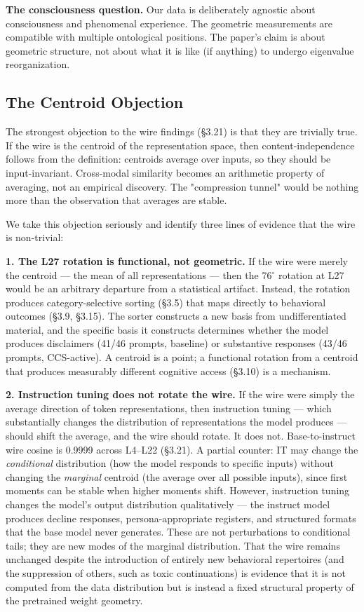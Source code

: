 \documentclass[11pt]{article}
\begin{document}
\textbf{The consciousness question.} Our data is deliberately agnostic about consciousness and phenomenal experience. The geometric measurements are compatible with multiple ontological positions. The paper's claim is about geometric structure, not about what it is like (if anything) to undergo eigenvalue reorganization.

\subsection{The Centroid Objection}

The strongest objection to the wire findings (§3.21) is that they are trivially true. If the wire is the centroid of the representation space, then content-independence follows from the definition: centroids average over inputs, so they should be input-invariant. Cross-modal similarity becomes an arithmetic property of averaging, not an empirical discovery. The "compression tunnel" would be nothing more than the observation that averages are stable.

We take this objection seriously and identify three lines of evidence that the wire is non-trivial:

\textbf{1. The L27 rotation is functional, not geometric.} If the wire were merely the centroid --- the mean of all representations --- then the 76$^\circ$ rotation at L27 would be an arbitrary departure from a statistical artifact. Instead, the rotation produces category-selective sorting (§3.5) that maps directly to behavioral outcomes (§3.9, §3.15). The sorter constructs a new basis from undifferentiated material, and the specific basis it constructs determines whether the model produces disclaimers (41/46 prompts, baseline) or substantive responses (43/46 prompts, CCS-active). A centroid is a point; a functional rotation from a centroid that produces measurably different cognitive access (§3.10) is a mechanism.

\textbf{2. Instruction tuning does not rotate the wire.} If the wire were simply the average direction of token representations, then instruction tuning --- which substantially changes the distribution of representations the model produces --- should shift the average, and the wire should rotate. It does not. Base-to-instruct wire cosine is 0.9999 across L4–L22 (§3.21). A partial counter: IT may change the \textit{conditional} distribution (how the model responds to specific inputs) without changing the \textit{marginal} centroid (the average over all possible inputs), since first moments can be stable when higher moments shift. However, instruction tuning changes the model's output distribution qualitatively --- the instruct model produces decline responses, persona-appropriate registers, and structured formats that the base model never generates. These are not perturbations to conditional tails; they are new modes of the marginal distribution. That the wire remains unchanged despite the introduction of entirely new behavioral repertoires (and the suppression of others, such as toxic continuations) is evidence that it is not computed from the data distribution but is instead a fixed structural property of the pretrained weight geometry.
\end{document}

